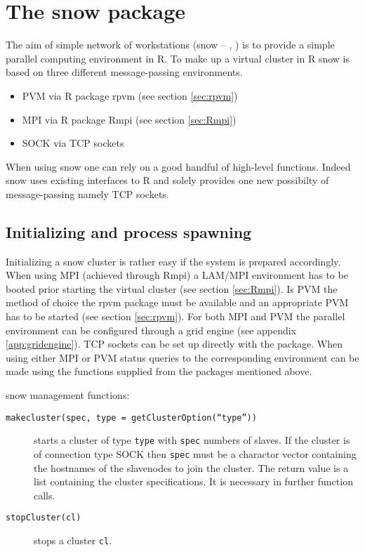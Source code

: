 \section{The snow package}
\label{sec:snow}
The aim of simple network of workstations (snow --
\cite{rossini03snow}, \cite{tierney07snow}) is to provide a simple
parallel computing environment in R. To make up a virtual cluster in R
snow is based on three different message-passing environments.

\begin{itemize}
\item PVM via R package rpvm (see section \ref{sec:rpvm})
\item MPI via R package Rmpi (see section \ref{sec:Rmpi})
\item SOCK via TCP sockets
\end{itemize}

When using snow one can rely on a good handful of high-level
functions. Indeed snow uses existing interfaces to R and solely
provides one new possibilty of message-passing namely TCP sockets. 

\subsection{Initializing and process spawning}

Initializing a snow cluster is rather easy if the system is prepared
accordingly. When using MPI (achieved through Rmpi) a LAM/MPI
environment has to be booted prior starting the virtual cluster (see
section \ref{sec:Rmpi}). Is PVM the method of choice the rpvm package
must be available and an appropriate PVM has to be started (see
section \ref{sec:rpvm}). For both MPI and PVM the parallel environment
can be configured through a grid engine (see appendix
\ref{app:gridengine}). TCP sockets can be set up directly with the
package. When using either MPI or PVM status queries to the
corresponding environment can be made using the functions supplied
from the packages mentioned above.


snow management functions:

\begin{description}
\item[\texttt{makecluster(spec, type = getClusterOption(``type''))}]
  starts a cluster of type \texttt{type} with \texttt{spec} numbers of
  slaves. If the cluster is of connection type SOCK then \texttt{spec}
  must be a charactor vector containing the hostnames of the
  slavenodes to join the cluster. The return value is a list
  containing the cluster specifications. It is necessary in further
  function calls.
\item[\texttt{stopCluster(cl)}] stops a cluster \texttt{cl}.
\end{description}


